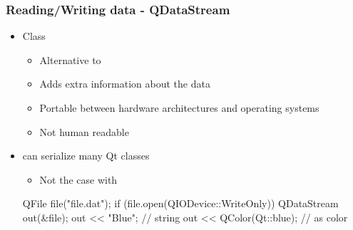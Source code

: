 \begin{slide}[fragile]\frametitle{Reading/Writing data - QDataStream}
  \begin{itemize}
  \item Class 
    \begin{itemize}
    \item Alternative to 
    \item Adds extra information about the data
    \item Portable between hardware architectures and operating systems
    \item Not human readable
    \end{itemize}
  \item {} can serialize many Qt classes
    \begin{itemize}
    \item Not the case with 
    \end{itemize}
  \begin{cpp}
QFile file("file.dat");
if (file.open(QIODevice::WriteOnly)) {
  QDataStream out(&file);
  out << "Blue"; // string
  out << QColor(Qt::blue); // as color
}
  \end{cpp}
  \end{itemize}
\end{slide}


